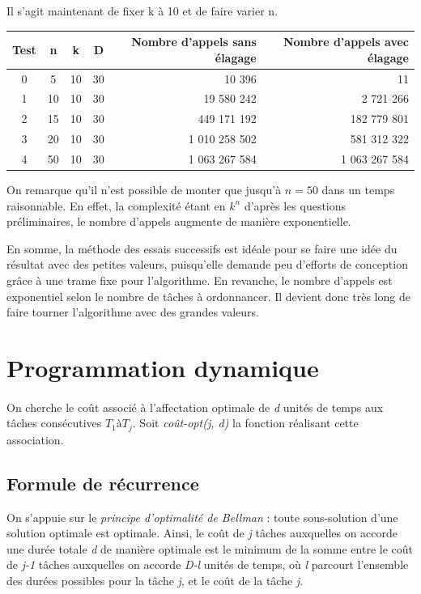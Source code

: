 \documentclass[a4paper, titlepage]{article}
\begin{document}
	Il s'agit maintenant de fixer k à 10 et de faire varier n.

	\begin{center}
		\begin{tabular}{|c|c|c|c|r|r|}
			\hline
			Test	& n	& k	& D	& Nombre d'appels sans élagage & Nombre d'appels avec élagage \\
			\hline
			0 	& 5	& 10	& 30	& 10 396 	& 11 \\ \hline
			1 	& 10	& 10	& 30	& 19 580 242 	& 2 721 266 \\ \hline
			2 	& 15	& 10	& 30	& 449 171 192 	& 182 779 801 \\ \hline
			3 	& 20	& 10	& 30	& 1 010 258 502 	& 581 312 322 \\ \hline
			4 	& 50	& 10	& 30	& 1 063 267 584 	& 1 063 267 584 \\
			\hline
		\end{tabular}
	\end{center}
	
	On remarque qu'il n'est possible de monter que jusqu'à $n = 50$ dans un temps raisonnable.
	En effet, la complexité étant en $k^n$ d'après les questions préliminaires, le nombre d'appels augmente de manière exponentielle.
	
	En somme, la méthode des essais successifs est idéale pour se faire une idée du résultat avec des petites valeurs, puisqu'elle demande peu d'efforts de conception grâce à une trame fixe pour l'algorithme.
	En revanche, le nombre d'appels est exponentiel selon le nombre de tâches à ordonnancer.
	Il devient donc très long de faire tourner l'algorithme avec des grandes valeurs.

\section{Programmation dynamique}
	\paragraph{}
		On cherche le coût associé à l'affectation optimale de \emph{d} unités de temps aux tâches consécutives $T_{1} à T_{j}$. Soit \emph{coût-opt(j, d)} la fonction réalisant cette association.

	\subsection{Formule de récurrence}
		On s'appuie sur le \emph{principe d'optimalité de Bellman} : toute sous-solution d'une solution optimale est optimale. Ainsi, le coût de \emph{j} tâches auxquelles on accorde une durée totale \emph{d} de manière optimale est le minimum de la somme entre le coût de \emph{j-1} tâches auxquelles on accorde \emph{D-l} unités de temps, où \emph{l} parcourt l'ensemble des durées possibles pour la tâche \emph{j}, et le coût de la tâche \emph{j}.
\end{document}
